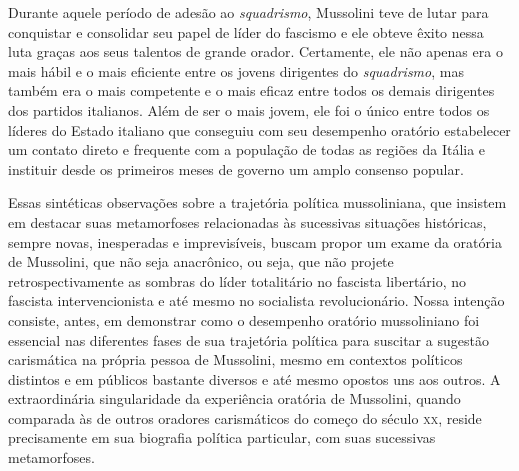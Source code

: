 Durante aquele período de adesão ao \emph{squadrismo}, Mussolini teve de
lutar para conquistar e consolidar seu papel de líder do fascismo e ele
obteve êxito nessa luta graças aos seus talentos de grande orador.
Certamente, ele não apenas era o mais hábil e o mais eficiente entre os
jovens dirigentes do \emph{squadrismo}, mas também era o mais competente
e o mais eficaz entre todos os demais dirigentes dos partidos italianos.
Além de ser o mais jovem, ele foi o único entre todos os líderes do
Estado italiano que conseguiu com seu desempenho oratório estabelecer um
contato direto e frequente com a população de todas as regiões da Itália
e instituir desde os primeiros meses de governo um amplo consenso
popular.

Essas sintéticas observações sobre a trajetória política mussoliniana,
que insistem em destacar suas metamorfoses relacionadas às sucessivas
situações históricas, sempre novas, inesperadas e imprevisíveis, buscam
propor um exame da oratória de Mussolini, que não seja anacrônico, ou
seja, que não projete retrospectivamente as sombras do líder totalitário
no fascista libertário, no fascista intervencionista e até mesmo no
socialista revolucionário. Nossa intenção consiste, antes, em demonstrar
como o desempenho oratório mussoliniano foi essencial nas diferentes
fases de sua trajetória política para suscitar a sugestão carismática na
própria pessoa de Mussolini, mesmo em contextos políticos distintos e em
públicos bastante diversos e até mesmo opostos uns aos outros. A
extraordinária singularidade da experiência oratória de Mussolini,
quando comparada às de outros oradores carismáticos do começo do século
\textsc{xx}, reside precisamente em sua biografia política particular, com suas
sucessivas metamorfoses.


